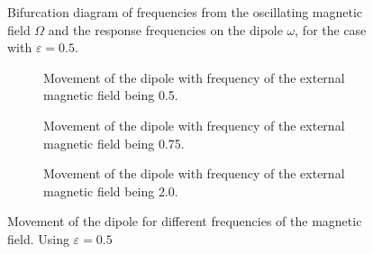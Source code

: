 \begin{figure}
    \centering
    \scalebox{0.66}{}
    \caption{Bifurcation diagram of frequencies from the oscillating magnetic field $\Omega$ and the response frequencies on the dipole $\omega$, for the case with $\varepsilon = 0.5$.}
    \label{fig:bif05}
\end{figure}
\begin{figure*}
    \begin{subfigure}{\textwidth}
        
        \caption{Movement of the dipole with frequency of the external magnetic field being 0.5.}
        \label{fig:omega05}
    \end{subfigure}
    \begin{subfigure}{\textwidth}
        
        \caption{Movement of the dipole with frequency of the external magnetic field being 0.75.}
        \label{fig:omega075}
    \end{subfigure}
    \begin{subfigure}{\textwidth}
        
        \caption{Movement of the dipole with frequency of the external magnetic field being 2.0.}
        \label{fig:omega20}
    \end{subfigure}
    \caption{Movement of the dipole for different frequencies of the magnetic field. Using $\varepsilon = 0.5$}
\end{figure*}
